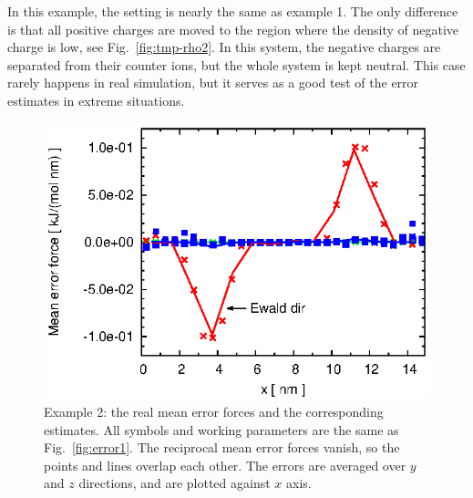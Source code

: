 \documentclass[aps,pre,preprint,unsortedaddress]{revtex4}
\begin{document}
In this example, the setting is nearly the same as
example 1. The only difference is that all positive charges
are moved to the region where the density of negative charge is low,
see Fig.~\ref{fig:tmp-rho2}.
In this system, the negative charges are separated from their
counter ions, but the whole system is kept neutral. This case rarely
happens in real simulation, but it serves as a good test of the error
estimates in extreme situations.

\begin{figure}
  \centering
  \includegraphics[]{fig.new/fig.rand2.meanf.eps}
  \caption{
    Example 2: the real mean error forces and the corresponding
    estimates. All symbols and working parameters are the same
    as     Fig.~\ref{fig:error1}.
    The reciprocal mean error forces vanish, so the points and lines
    overlap each other. 
    The errors are averaged over $y$ and $z$ directions, and are
    plotted against $x$ axis.
    }
  \label{fig:meanf2}
\end{figure}
\end{document}
